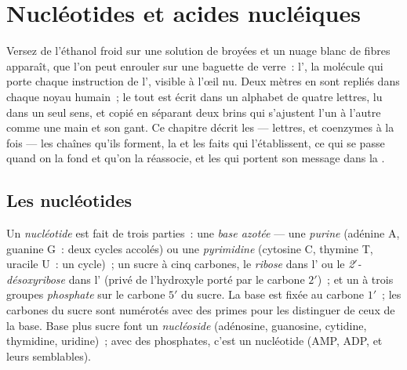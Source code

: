 \chapter{Nucléotides et acides nucléiques}\label{ch:b1:nucleic-acids}

Versez de l'éthanol froid sur une solution de  broyées et un
nuage blanc de fibres apparaît, que l'on peut enrouler sur une baguette
de verre~: l', la molécule qui porte chaque instruction de
l', visible à l'œil nu. Deux mètres en sont repliés dans chaque
noyau humain~; le tout est écrit dans un alphabet de quatre lettres, lu
dans un seul sens, et copié en séparant deux brins qui s'ajustent l'un à
l'autre comme une main et son gant. Ce chapitre décrit les 
--- lettres,  et coenzymes à la fois --- les chaînes
qu'ils forment, la  et les faits qui l'établissent, ce qui
se passe quand on la fond et qu'on la réassocie, et les  qui portent
son message dans la .

\section{Les nucléotides}

\begin{definition}[Nucléotide]\label{def:b1:nucleic-acids:nucleotide}
Un \emph{nucléotide} est fait de trois parties~: une
\emph{base azotée} --- une
\emph{purine} (adénine A, guanine G~: deux cycles accolés)
ou une \emph{pyrimidine} (cytosine C, thymine T,
uracile U~: un cycle)~; un sucre à cinq carbones, le \emph{ribose} dans
l' ou le \emph{2$'$-désoxyribose} dans l' (privé de l'hydroxyle
porté par le carbone $2'$)~; et un à trois groupes \emph{phosphate} sur
le carbone $5'$ du sucre. La base est fixée au carbone $1'$~; les
carbones du sucre sont numérotés avec des primes pour les distinguer de
ceux de la base. Base plus sucre font un \emph{nucléoside} (adénosine,
guanosine, cytidine, thymidine, uridine)~; avec des phosphates, c'est un
nucléotide (AMP, ADP,  et leurs semblables).
\end{definition}

